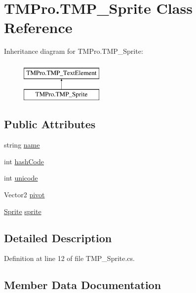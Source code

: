 \hypertarget{class_t_m_pro_1_1_t_m_p___sprite}{}\section{T\+M\+Pro.\+T\+M\+P\+\_\+\+Sprite Class Reference}
\label{class_t_m_pro_1_1_t_m_p___sprite}
Inheritance diagram for T\+M\+Pro.\+T\+M\+P\+\_\+\+Sprite\+:\begin{figure}[H]
\begin{center}
\leavevmode
\includegraphics[height=2.000000cm]{class_t_m_pro_1_1_t_m_p___sprite}
\end{center}
\end{figure}
\subsection*{Public Attributes}
\begin{DoxyCompactItemize}
\item 
string \mbox{\hyperlink{class_t_m_pro_1_1_t_m_p___sprite_ae78cacfca5d783a5515ce93bc9a6582f}{name}}
\item 
int \mbox{\hyperlink{class_t_m_pro_1_1_t_m_p___sprite_a8206db44a70cc5ea85f088ee7f23842b}{hash\+Code}}
\item 
int \mbox{\hyperlink{class_t_m_pro_1_1_t_m_p___sprite_ae3dfeb6d8025927bc22bb5aa9a71df4e}{unicode}}
\item 
Vector2 \mbox{\hyperlink{class_t_m_pro_1_1_t_m_p___sprite_a809fb162ee886b2ea9025590e3aa09ec}{pivot}}
\item 
\mbox{\hyperlink{namespace_t_m_pro_ab5662f47179bf1b81c575ecf80b24065a51f2b7b14433aa22c67d1f4fc18943cd}{Sprite}} \mbox{\hyperlink{class_t_m_pro_1_1_t_m_p___sprite_ac12a75abda3c4e38c4df03a3a7269168}{sprite}}
\end{DoxyCompactItemize}


\subsection{Detailed Description}


Definition at line 12 of file T\+M\+P\+\_\+\+Sprite.\+cs.



\subsection{Member Data Documentation}
\mbox{\label{class_t_m_pro_1_1_t_m_p___sprite_a8206db44a70cc5ea85f088ee7f23842b}} 
